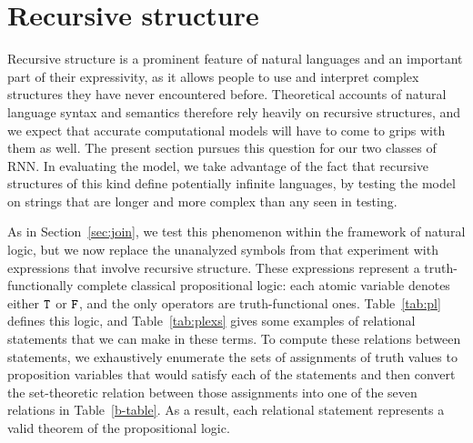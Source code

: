 \section{Recursive structure}\label{sec:recursion}

Recursive structure is a prominent feature of natural languages and
an important part of their expressivity, as it allows people to use
and interpret complex structures they have never encountered before.
Theoretical accounts of natural language syntax and semantics
therefore rely heavily on recursive structures, and we expect that
accurate computational models will have to come to grips with them as
well. The present section pursues this question for our two classes of
RNN. In evaluating the model, we take advantage of the fact that
recursive structures of this kind define potentially infinite
languages, by testing the model on strings that are longer and more
complex than any seen in testing.


As in Section~\ref{sec:join}, we test this phenomenon within the
framework of natural logic, but we now replace the unanalyzed symbols
from that experiment with expressions that involve recursive
structure. These expressions represent a truth-functionally complete classical
propositional logic: each atomic variable denotes either $\texttt{T}$ or
$\texttt{F}$, and the only operators are truth-functional ones.
Table~\ref{tab:pl} defines this logic, and Table~\ref{tab:plexs} gives
some examples of relational statements that we can make
in these terms. To compute these relations between statements, we
exhaustively enumerate the sets of assignments of truth values to
proposition variables that would satisfy each of the statements and
then convert the set-theoretic relation between those assignments into
one of the seven relations in Table~\ref{b-table}. As a result, each relational
statement represents a valid theorem of the propositional logic.

